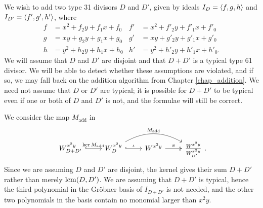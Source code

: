 We wish to add two type 31 divisors $D$ and $D'$,
given by ideals $I_D = \left\langle f,g,h \right\rangle$ and $I_{D'} = \left\langle f',g',h' \right\rangle$, where
\begin{align*}
  f &= x^2 + f_2y + f_1x + f_0 & f' &= x^2 + f'_2y + f'_1x + f'_0 \\
  g &=  xy + g_2y + g_1x + g_0 & g' &=  xy + g'_2y + g'_1x + g'_0 \\
  h &= y^2 + h_2y + h_1x + h_0 & h' &= y^2 + h'_2y + h'_1x + h'_0.
\end{align*}
We will assume that $D$ and $D'$ are disjoint and that $D + D'$ is a typical type 61 divisor.
We will be able to detect whether these assumptions are violated,
and if so, we may fall back on the addition algorithm from Chapter \ref{chap_addition}.
We need not assume that $D$ or $D'$ are typical;
it is possible for $D + D'$ to be typical even if one or both of $D$ and $D'$ is not,
and the formulae will still be correct.

We consider the map $M_{\text{add}}$ in 
\[  \begin{tikzcd}
      W_{D+D'}^{x^2y} \arrow[hook]{r}{\ker M_{\text{add}}} & 
      W_D^{x^2y} \arrow[hook]{r}{\iota} \arrow[bend left]{rr}{M_{\text{add}}} & 
      W^{x^2y} \arrow[two heads]{r}{\pi} & 
      \frac {W^{x^2y}} {W_{D'}^{x^2y}}
    \end{tikzcd}. \]
Since we are assuming $D$ and $D'$ are disjoint, the kernel gives their sum $D + D'$ rather than merely $\operatorname{lcm}(D,D')$.
We are assuming that $D + D'$ is typical, hence the third polynomial in the Gr\"obner basis of $I_{D+D'}$ is not needed,
and the other two polynomials in the basis contain no monomial larger than $x^2y$.

